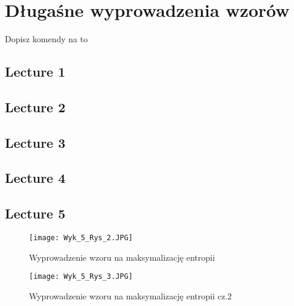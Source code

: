 \documentclass[12pt,a4paper]{report}
\newcommand{\com}[1]{{\color{red} #1}}
\begin{document}
\chapter{Długaśne wyprowadzenia wzorów}

\com{Dopisz komendy na to}

\section{Lecture 1}

\section{Lecture 2}

\section{Lecture 3}

\section{Lecture 4}

\section{Lecture 5}

\begin{figure}[!ht]
    \centering
    \texttt{[image: Wyk\_5\_Rys\_2.JPG]}
    \caption{Wyprowadzenie wzoru na maksymalizację entropii}
    \label{fig:lec_5:app:maksymalizacja_entropii}
\end{figure}


\begin{figure}[!ht]
    \centering
    \texttt{[image: Wyk\_5\_Rys\_3.JPG]}
    \caption{Wyprowadzenie wzoru na maksymalizację entropii cz.2}
    \label{fig:lec_5:app:maksymalizacja_entropii_2}
\end{figure}
\end{document}
